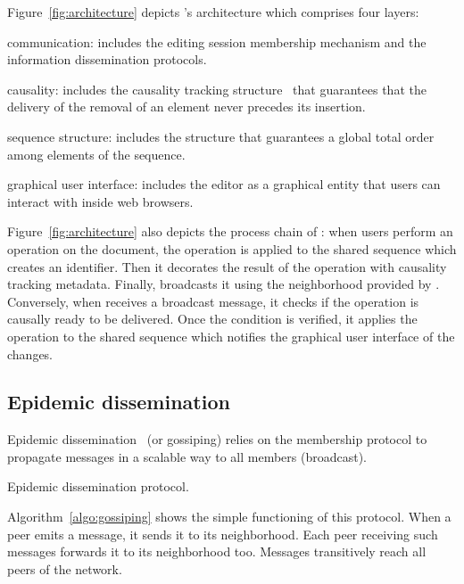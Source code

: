 Figure~\ref{fig:architecture} depicts \CRATE's architecture which comprises four
layers:
\begin{inparaenum}[(i)]
\item communication: includes the editing session membership mechanism and the
  information dissemination protocols.
\item causality: includes the causality tracking
  structure~\cite{malkhi2007concise} that guarantees that the delivery of the
  removal of an element never precedes its insertion.
\item sequence structure: includes the structure that guarantees a global
  total order among elements of the sequence.
\item graphical user interface: includes the editor as a graphical entity that
  users can interact with inside web browsers.
\end{inparaenum}
Figure~\ref{fig:architecture} also depicts the process chain of \CRATE: when
users perform an operation on the document, the operation is applied to the
shared sequence which creates an \LSEQ identifier. Then it decorates the result
of the operation with causality tracking metadata. Finally, \CRATE broadcasts it
using the neighborhood provided by \SPRAY.  Conversely, when \CRATE receives a
broadcast message, it checks if the operation is causally ready to be
delivered. Once the condition is verified, it applies the operation to the
shared sequence which notifies the graphical user interface of the changes.



\subsection{Epidemic dissemination}
\label{subsec:gossiping}

Epidemic dissemination~\cite{birman1999bimodal,demers1987epidemic} (or
gossiping) relies on the membership protocol to propagate messages in a scalable
way to all members (broadcast).

\begin{algorithm}[h]
  
  \caption{\label{algo:gossiping}Epidemic dissemination protocol.}
\end{algorithm}

Algorithm~\ref{algo:gossiping} shows the simple functioning of this
protocol. When a peer emits a message, it sends it to its neighborhood. Each
peer receiving such messages forwards it to its neighborhood too. Messages
transitively reach all peers of the network.

